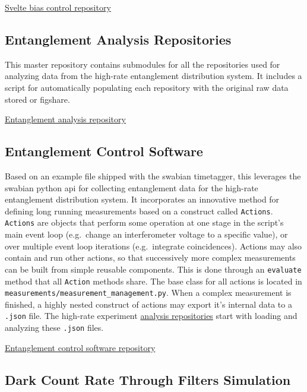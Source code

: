 \documentclass[11pt]{caltech_thesis} %
\begin{document}
\href{https://github.com/sansseriff/snspd-bias-controll-svelte}{Svelte bias control repository}

\hypertarget{entanglement-analysis-repositories}{%
\subsection{Entanglement Analysis Repositories}\label{entanglement-analysis-repositories}}

This master repository contains submodules for all the repositories used for analyzing data from the high-rate entanglement distribution system. It includes a script for automatically populating each repository with the original raw data stored or figshare.

\href{https://github.com/sansseriff/highrate_origin}{Entanglement analysis repository}

\hypertarget{entanglement-control-software}{%
\subsection{Entanglement Control Software}\label{entanglement-control-software}}

Based on an example file shipped with the swabian timetagger, this leverages the swabian python api for collecting entanglement data for the high-rate entanglement distribution system. It incorporates an innovative method for defining long running measurements based on a construct called \texttt{Actions}. \texttt{Actions} are objects that perform some operation at one stage in the script's main event loop (e.g.~change an interferometer voltage to a specific value), or over multiple event loop iterations (e.g.~integrate coincidences). Actions may also contain and run other actions, so that successively more complex measurements can be built from simple reusable components. This is done through an \texttt{evaluate} method that all \texttt{Action} methods share. The base class for all actions is located in \texttt{measurements/measurement\_management.py}. When a complex measurement is finished, a highly nested construct of actions may export it's internal data to a \texttt{.json} file. The high-rate experiment \href{https://github.com/sansseriff/highrate_origin}{analysis repositories} start with loading and analyzing these \texttt{.json} files.

\href{https://github.com/sansseriff/swabian_entanglement_gui}{Entanglement control software repository}

\hypertarget{dark-count-rate-through-filters-simulation}{%
\subsection{Dark Count Rate Through Filters Simulation}\label{dark-count-rate-through-filters-simulation}}
\end{document}
